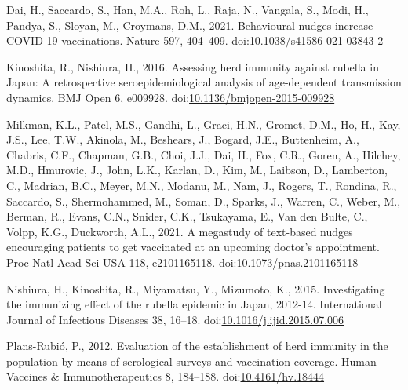 \documentclass[
  11pt,
  a4paper,
]{article}
\newlength{\cslhangindent}
\newlength{\cslentryspacingunit} %
\newenvironment{CSLReferences}[2] %
 {%
  \setlength{\parindent}{0pt}
  \ifodd #1
  \let\oldpar\par
  \def\par{\hangindent=\cslhangindent\oldpar}
  \fi
  \setlength{\parskip}{#2\cslentryspacingunit}
 }%
 {}
\begin{document}
\hypertarget{refs}{}
\begin{CSLReferences}{1}{0}
\leavevmode{}%
Dai, H., Saccardo, S., Han, M.A., Roh, L., Raja, N., Vangala, S., Modi, H., Pandya, S., Sloyan, M., Croymans, D.M., 2021. Behavioural nudges increase {COVID-19} vaccinations. Nature 597, 404--409. doi:\href{https://doi.org/10.1038/s41586-021-03843-2}{10.1038/s41586-021-03843-2}

\leavevmode{}%
Kinoshita, R., Nishiura, H., 2016. Assessing herd immunity against rubella in {Japan}: A retrospective seroepidemiological analysis of age-dependent transmission dynamics. BMJ Open 6, e009928. doi:\href{https://doi.org/10.1136/bmjopen-2015-009928}{10.1136/bmjopen-2015-009928}

\leavevmode{}%
Milkman, K.L., Patel, M.S., Gandhi, L., Graci, H.N., Gromet, D.M., Ho, H., Kay, J.S., Lee, T.W., Akinola, M., Beshears, J., Bogard, J.E., Buttenheim, A., Chabris, C.F., Chapman, G.B., Choi, J.J., Dai, H., Fox, C.R., Goren, A., Hilchey, M.D., Hmurovic, J., John, L.K., Karlan, D., Kim, M., Laibson, D., Lamberton, C., Madrian, B.C., Meyer, M.N., Modanu, M., Nam, J., Rogers, T., Rondina, R., Saccardo, S., Shermohammed, M., Soman, D., Sparks, J., Warren, C., Weber, M., Berman, R., Evans, C.N., Snider, C.K., Tsukayama, E., Van den Bulte, C., Volpp, K.G., Duckworth, A.L., 2021. A megastudy of text-based nudges encouraging patients to get vaccinated at an upcoming doctor's appointment. Proc Natl Acad Sci USA 118, e2101165118. doi:\href{https://doi.org/10.1073/pnas.2101165118}{10.1073/pnas.2101165118}

\leavevmode{}%
Nishiura, H., Kinoshita, R., Miyamatsu, Y., Mizumoto, K., 2015. Investigating the immunizing effect of the rubella epidemic in {Japan}, 2012-14. International Journal of Infectious Diseases 38, 16--18. doi:\href{https://doi.org/10.1016/j.ijid.2015.07.006}{10.1016/j.ijid.2015.07.006}

\leavevmode{}%
Plans-Rubió, P., 2012. Evaluation of the establishment of herd immunity in the population by means of serological surveys and vaccination coverage. Human Vaccines \& Immunotherapeutics 8, 184--188. doi:\href{https://doi.org/10.4161/hv.18444}{10.4161/hv.18444}

\end{CSLReferences}
\end{document}
